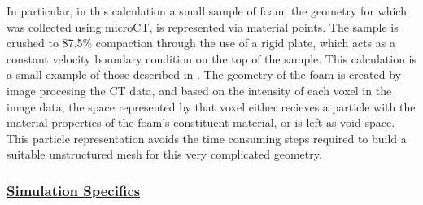 In particular, in this calculation a small sample of foam, the geometry
for which was collected using microCT, is represented via material points.
The sample is crushed to 87.5\% compaction through the use of a rigid plate, which
acts as a constant velocity boundary condition on the top of the sample.  This
calculation is a small example of those described in \cite{brydonfoam}.  The
geometry of the foam is created by image procesing the CT data, and based
on the intensity of each voxel in the image data, the space represented
by that voxel either recieves a particle with the material properties of the
foam's constituent material, or is left as void space.  This particle
representation avoids the time consuming steps required to build a suitable
unstructured mesh for this very complicated geometry.
 
\subsubsection*{\underline{Simulation Specifics}}
